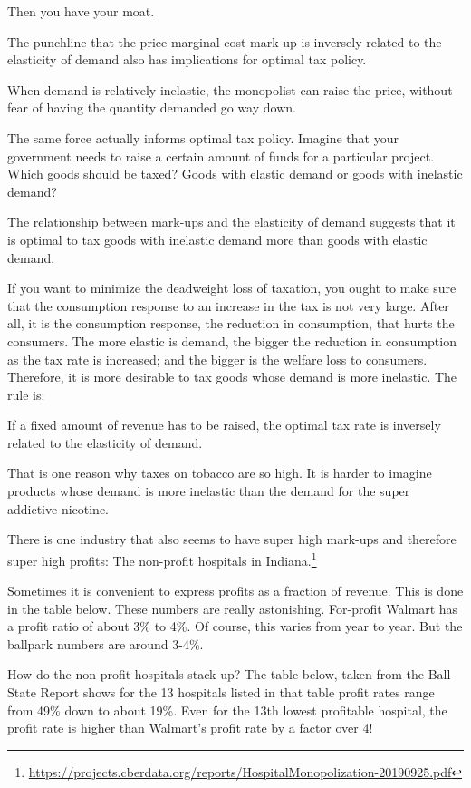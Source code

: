 \documentclass[
]{book}
\begin{document}
Then you have your moat.

The punchline that the price-marginal cost mark-up is inversely related to the elasticity of demand also has implications for optimal tax policy.

When demand is relatively inelastic, the monopolist can raise the price, without fear of having the quantity demanded go way down.

The same force actually informs optimal tax policy. Imagine that your government needs to raise a certain amount of funds for a particular project. Which goods should be taxed? Goods with elastic demand or goods with inelastic demand?

The relationship between mark-ups and the elasticity of demand suggests that it is optimal to tax goods with inelastic demand more than goods with elastic demand.

If you want to minimize the deadweight loss of taxation, you ought to make sure that the consumption response to an increase in the tax is not very large. After all, it is the consumption response, the reduction in consumption, that hurts the consumers. The more elastic is demand, the bigger the reduction in consumption as the tax rate is increased; and the bigger is the welfare loss to consumers. Therefore, it is more desirable to tax goods whose demand is more inelastic. The rule is:

If a fixed amount of revenue has to be raised, the optimal tax rate is inversely related to the elasticity of demand.

That is one reason why taxes on tobacco are so high. It is harder to imagine products whose demand is more inelastic than the demand for the super addictive nicotine.

There is one industry that also seems to have super high mark-ups and therefore super high profits: The non-profit hospitals in Indiana.\footnote{\url{https://projects.cberdata.org/reports/HospitalMonopolization-20190925.pdf}}

Sometimes it is convenient to express profits as a fraction of revenue. This is done in the table below. These numbers are really astonishing. For-profit Walmart has a profit ratio of about 3\% to 4\%. Of course, this varies from year to year. But the ballpark numbers are around 3-4\%.

How do the non-profit hospitals stack up? The table below, taken from the Ball State Report shows for the 13 hospitals listed in that table profit rates range from 49\% down to about 19\%. Even for the 13th lowest profitable hospital, the profit rate is higher than Walmart's profit rate by a factor over 4!
\end{document}
